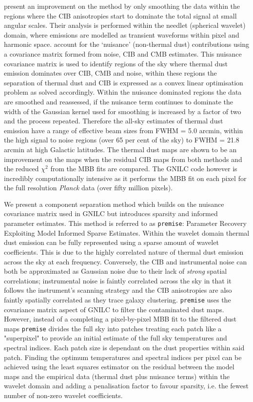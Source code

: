 \documentclass[a4paper,fleqn,usenatbib]{mnras}
\begin{document}
\citet{gnilc} present an improvement on the \citet{pr2} method by only smoothing the data within the regions where the CIB anisotropies start to dominate the total signal at small angular scales. Their analysis is performed within the needlet (spherical wavelet) domain, where emissions are modelled as transient waveforms within pixel and harmonic space. \citet{gnilc} account for the `nuisance'  (non-thermal dust) contributions using a covariance matrix formed from noise, CIB and CMB estimates. This nuisance covariance matrix is used to identify regions of the sky where thermal dust emission dominates over CIB, CMB and noise, within these regions the separation of thermal dust and CIB is expressed as a convex linear optimisation problem as solved accordingly. Within the nuisance dominated regions the data are smoothed and reassessed, if the nuisance term continues to dominate the width of the Gaussian kernel used for smoothing is increased by a factor of two and the process repeated. Therefore the \citet{gnilc} all-sky estimates of thermal dust emission have a range of effective beam sizes from FWHM = 5.0 arcmin, within the high signal to noise regions (over 65 per cent of the sky) to FWHM = 21.8 arcmin at high Galactic latitudes. The \citet{gnilc} thermal dust maps are shown to be an improvement on the \citet{pr2} maps when the residual CIB maps from both methods and the reduced $\chi^2$ from the MBB fits are compared. The GNILC code however is incredibly computationally intensive as it performs the MBB fit on each pixel for the full resolution {\it{Planck}} data (over fifty million pixels). 

We present a component separation method which builds on the nuisance covariance matrix used in GNILC but introduces sparsity and informed parameter estimates. This method is referred to as {\texttt{premise}}: Parameter Recovery Exploiting Model Informed Sparse Estimates. Within the wavelet domain thermal dust emission can be fully represented using a sparse amount of wavelet coefficients. This is due to the highly correlated nature of thermal dust emission across the sky at each frequency. Conversely, the CIB and instrumental noise can both be approximated as Gaussian noise due to their lack of {\it{strong}} spatial correlations; instrumental noise is faintly correlated across the sky in that it follows the instrument's scanning strategy and the CIB anisotropies are also faintly spatially correlated as they trace galaxy clustering. {\texttt{premise}} uses the covariance matrix aspect of GNILC to filter the contaminated dust maps. However, instead of a completing a pixel-by-pixel MBB fit to the filtered dust maps {\texttt{premise}} divides the full sky into patches treating each patch like a "superpixel" to provide an initial estimate of the full sky temperatures and spectral indices. Each patch size is dependant on the dust properties within said patch. Finding the optimum temperatures and spectral indices per pixel can be achieved using the least squares estimator on the residual between the model maps and the empirical data (thermal dust plus nuisance terms) within the wavelet domain and adding a penalisation factor to favour sparsity, i.e. the fewest number of non-zero wavelet coefficients.
\end{document}
